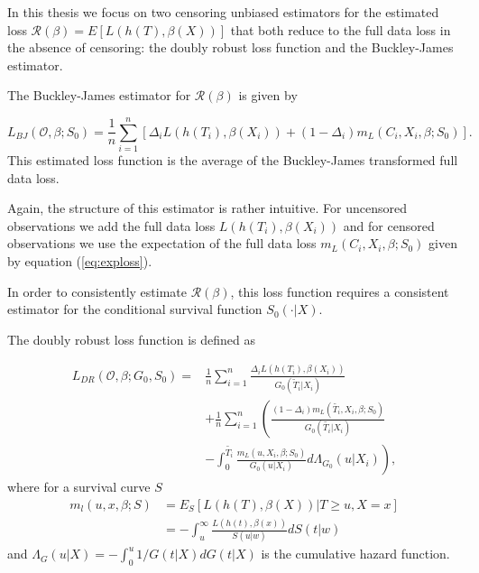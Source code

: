 \documentclass[12pt, a4paper]{article}
\theoremstyle{definition}
\theoremstyle{plain}
\numberwithin{equation}{section}
\numberwithin{figure}{section}
\numberwithin{table}{section}
\begin{document}
	In this thesis we focus on two censoring unbiased estimators for the estimated loss $\mathcal{R} (\beta) = E[L(h(T),\beta(X))]$ that both reduce to the full data loss in the absence of censoring: the doubly robust loss function and the Buckley-James estimator.
	
	
	The Buckley-James estimator for $\mathcal{R}(\beta)$ is given by
	
	\begin{equation}\label{eq:bj}
	L_{BJ}(\mathcal{O}, \beta; S_0) = \frac{1}{n} \sum_{i=1}^n \left[ \Delta_i L(h(T_i), \beta(X_i))+(1-\Delta_i)m_L(C_i, X_i, \beta; S_0)\right].
	\end{equation}
	This estimated loss function is the average of the Buckley-James transformed full data loss.
	
	Again, the structure of this estimator is rather intuitive.
	For uncensored observations we add the full data loss $L(h(T_i), \beta(X_i))$ and for censored observations we use the expectation of the full data loss $m_L(C_i, X_i, \beta; S_0)$ given by equation (\ref{eq:exploss}).
	
	In order to consistently estimate $\mathcal{R}(\beta)$, this loss function requires a consistent estimator for the conditional survival function $S_0(\cdot\vert X)$.
	
	The doubly robust loss function is defined as
	
	
	\begin{equation}\label{eq:dr}
	\begin{split}
		L_{DR}(\mathcal{O}, \beta; G_0, S_0) = & \frac{1}{n} \sum_{i=1}^n \frac{\Delta_i L(h(T_i),\beta(X_i))}{G_0(\tilde{T}_i\vert X_i)}\\
		~ & + \frac{1}{n} \sum_{i=1}^n \left(\frac{(1-\Delta_i)m_L(\tilde{T_i}, X_i, \beta; S_0)}{G_0(\tilde{T_i}\vert X_i)} \right.\\
		& - \left. \int _0^{\tilde{T_i}} \frac{m_L(u, X_i, \beta; S_0)}{G_0(u \vert X_i)} d \Lambda_{G_0}(u \vert X_i) \right),
	\end{split}
	\end{equation}
	where for a survival curve $S$
	\begin{equation}\label{eq:exploss}
	\begin{split}
		m_l(u,x,\beta; S) &= E_S[L(h(T), \beta(X)) \vert T \geq u, X = x]\\
		&= - \int_u^{\infty} \frac{L(h(t), \beta(x))}{S(u \vert w)} dS(t\vert w)
	\end{split}
	\end{equation}
	and $\Lambda_G(u\vert X) = - \int_0^u  1/ G(t\vert X)dG(t \vert X)$ is the cumulative hazard function.
	
\end{document}
